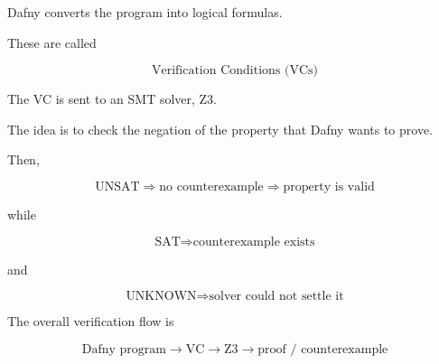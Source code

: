 \documentclass[11pt]{book}
\begin{document}
Dafny converts the program into logical formulas.

These are called

\[
\text{Verification Conditions (VCs)}
\]

The VC is sent to an SMT solver, Z3.

The idea is to check the negation of the property that
Dafny wants to prove.

Then,

\[
\text{UNSAT}
\Rightarrow
\text{no counterexample}
\Rightarrow
\text{property is valid}
\]

while

\[
\text{SAT}
\Rightarrow
\text{counterexample exists}
\]

and

\[
\text{UNKNOWN}
\Rightarrow
\text{solver could not settle it}
\]

\begin{ppkey}
The overall verification flow is

\[
\boxed{
\text{Dafny program}
\rightarrow
\text{VC}
\rightarrow
\text{Z3}
\rightarrow
\text{proof / counterexample}
}
\]
\end{ppkey}
\end{document}
